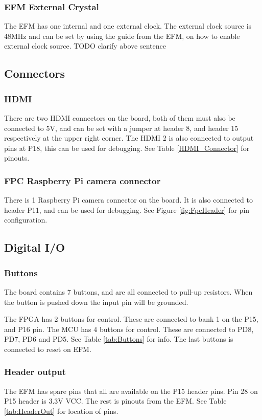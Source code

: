 \subsubsection{EFM External Crystal}
The EFM has one internal and one external clock.
The external clock source is 48MHz and can be set by using the guide from the EFM, on how to enable external clock source.
TODO clarify above sentence

\subsection{Connectors}
\subsubsection{HDMI}
There are two HDMI connectors on the board, both of them must also be connected to 5V, and can be set with a jumper at header 8, and header 15 respectively at the upper right corner.
The HDMI 2 is also connected to output pins at P18, this can be used for debugging.
See Table \ref{HDMI_Connector} for pinouts.

\subsubsection{FPC Raspberry Pi camera connector}
There is 1 Raspberry Pi camera connector on the board.
It is also connected to header P11, and can be used for debugging.
See Figure \ref{fig:FpcHeader} for pin configuration.

\subsection{Digital I/O}
\subsubsection{Buttons}
The board contains 7 buttons, and are all connected to pull-up resistors.
When the button is pushed down the input pin will be grounded.

The FPGA has 2 buttons for control.
These are connected to bank 1 on the P15, and P16 pin.
The MCU has 4 buttons for control.
These are connected to PD8, PD7, PD6 and PD5.
See Table \ref{tab:Buttons} for info.
The last buttons is connected to reset on EFM.

\subsubsection{Header output}
The EFM has spare pins that all are available on the P15 header pins.
Pin 28 on P15 header is 3.3V VCC.
The rest is pinouts from the EFM.
See Table \ref{tab:HeaderOut} for location of pins.

